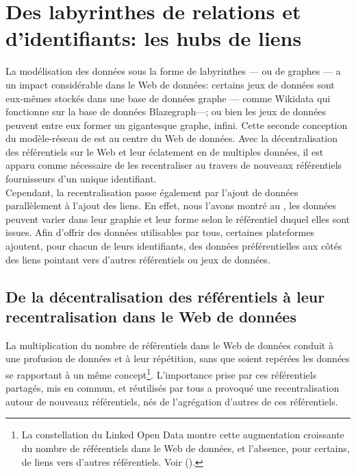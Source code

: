 \section{\label{III-A-2}Des labyrinthes de relations et d'identifiants: les hubs de liens}

La modélisation des données sous la forme de labyrinthes --- ou de graphes --- a un impact  considérable dans le Web de données: certains jeux de données sont eux-mêmes stockés dans une base de données graphe --- comme Wikidata qui fonctionne sur la base de données Blazegraph---; ou bien les jeux de données peuvent entre eux former un gigantesque graphe, infini. Cette seconde conception du modèle-réseau de  est au centre du Web de données. Avec la décentralisation des référentiels sur le Web et leur éclatement en de multiples données, il est apparu comme nécessaire de les recentraliser au travers de nouveaux référentiels fournisseurs d'un unique identifiant.\\

Cependant, la recentralisation passe également par l'ajout de données parallèlement à l'ajout des liens. En effet, nous l'avons montré au , les données peuvent varier dans leur graphie et leur forme selon le référentiel duquel elles sont issues. Afin d'offrir des données utilisables par tous, certaines plateformes ajoutent, pour chacun de leurs identifiants, des données préférentielles aux côtés des liens pointant vers d'autres référentiels ou jeux de données.

\subsection{\label{III-A-2-a}De la décentralisation des référentiels à leur recentralisation dans le Web de données}

La multiplication du nombre de référentiels dans le Web de données conduit à une profusion de données et à leur répétition, sans que soient repérées les données se rapportant à un même concept\footnote{La constellation du Linked Open Data montre cette augmentation croissante du nombre de référentiels dans le Web de données, et l'absence, pour certains, de liens vers d'autres référentiels. Voir  ().}. L'importance prise par ces référentiels partagés, mis en commun, et réutilisés par tous a provoqué une recentralisation autour de nouveaux référentiels, nés de l'agrégation d'autres de ces référentiels.\\

